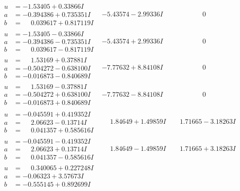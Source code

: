 \documentclass[1p]{elsarticle_modified}
\theoremstyle{definition}
\begin{document}
$$\begin{array}{c|c|c}
 \hline 
\begin{aligned}
u &= -1.53405 + 0.33866 I \\
a &= -0.394386 + 0.735351 I \\
b &= \phantom{-}0.039617 + 0.817119 I\end{aligned}
 & -5.43574 - 2.99336 I & \phantom{-0.000000 } 0 \\ \hline\begin{aligned}
u &= -1.53405 - 0.33866 I \\
a &= -0.394386 - 0.735351 I \\
b &= \phantom{-}0.039617 - 0.817119 I\end{aligned}
 & -5.43574 + 2.99336 I & \phantom{-0.000000 } 0 \\ \hline\begin{aligned}
u &= \phantom{-}1.53169 + 0.37881 I \\
a &= -0.504272 - 0.638100 I \\
b &= -0.016873 - 0.840689 I\end{aligned}
 & -7.77632 + 8.84108 I & \phantom{-0.000000 } 0 \\ \hline\begin{aligned}
u &= \phantom{-}1.53169 - 0.37881 I \\
a &= -0.504272 + 0.638100 I \\
b &= -0.016873 + 0.840689 I\end{aligned}
 & -7.77632 - 8.84108 I & \phantom{-0.000000 } 0 \\ \hline\begin{aligned}
u &= -0.045591 + 0.419352 I \\
a &= \phantom{-}2.06623 - 0.13714 I \\
b &= \phantom{-}0.041357 + 0.585616 I\end{aligned}
 & \phantom{-}1.84649 + 1.49859 I & \phantom{-}1.71665 - 3.18263 I \\ \hline\begin{aligned}
u &= -0.045591 - 0.419352 I \\
a &= \phantom{-}2.06623 + 0.13714 I \\
b &= \phantom{-}0.041357 - 0.585616 I\end{aligned}
 & \phantom{-}1.84649 - 1.49859 I & \phantom{-}1.71665 + 3.18263 I \\ \hline\begin{aligned}
u &= \phantom{-}0.340065 + 0.227248 I \\
a &= -0.06323 + 3.57673 I \\
b &= -0.555145 + 0.892699 I\end{aligned}

\end{array}$$
\end{document}
